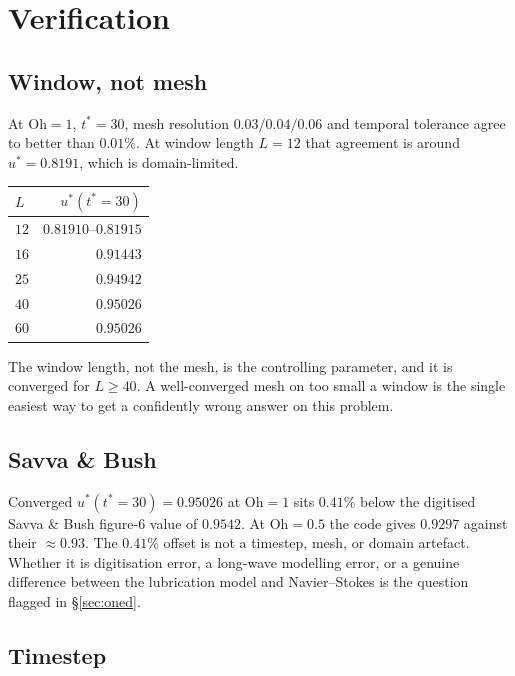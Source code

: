 \documentclass[11pt,a4paper]{article}
\newcommand{\Oh}{\mathrm{Oh}}
\newcommand{\ustar}{u^{*}}
\newcommand{\tstar}{t^{*}}
\begin{document}
\section{Verification}
\label{sec:verify}

\subsection{Window, not mesh}

At $\Oh = 1$, $\tstar = 30$, mesh resolution $0.03/0.04/0.06$ and temporal
tolerance agree to better than $0.01\%$. At window length $L = 12$ that
agreement is around $\ustar = 0.8191$, which is domain-limited.

\begin{center}
\begin{tabular}{lr}
\toprule
$L$ & $\ustar(\tstar = 30)$ \\
\midrule
$12$ & $0.81910$--$0.81915$ \\
$16$ & $0.91443$ \\
$25$ & $0.94942$ \\
$40$ & $0.95026$ \\
$60$ & $0.95026$ \\
\bottomrule
\end{tabular}
\end{center}

The window length, not the mesh, is the controlling parameter, and it is
converged for $L \ge 40$. A well-converged mesh on too small a window is the
single easiest way to get a confidently wrong answer on this problem.

\subsection{Savva \& Bush}
\label{sec:savva}

Converged $\ustar(\tstar = 30) = 0.95026$ at $\Oh = 1$ sits $0.41\%$ below
the digitised Savva \& Bush figure-6 value of $0.9542$. At $\Oh = 0.5$ the
code gives $0.9297$ against their $\approx 0.93$. The $0.41\%$ offset is not a
timestep, mesh, or domain artefact. Whether it is digitisation error, a
long-wave modelling error, or a genuine difference between the lubrication
model and Navier--Stokes is the question flagged in \S\ref{sec:oned}.

\subsection{Timestep}
\label{sec:timestep}
\end{document}
